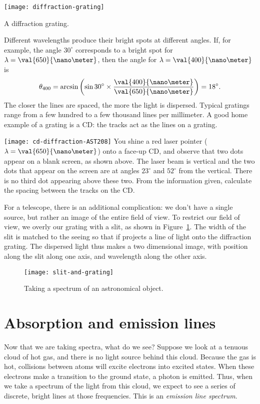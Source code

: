\begin{marginfigure}
\texttt{[image: diffraction-grating]}
\caption{A diffraction grating.
\label{f.diffraction-grating}}
\end{marginfigure}

Different wavelengths produce their bright spots at different angles.  If, for example, the angle $30^{\circ}$ corresponds to a bright spot for $\lambda=\val{650}{\nano\meter}$, then the angle for $\lambda=\val{400}{\nano\meter}$ is
\[
\theta_{400} = \arcsin\left(\sin 30^{\circ}\times\frac{\val{400}{\nano\meter}}{\val{650}{\nano\meter}}\right) = 18^{\circ}.
\]
The closer the lines are spaced, the more the light is dispersed. Typical gratings range from a few hundred to a few thousand lines per millimeter. A good home example of a grating is a CD: the tracks act as the lines on a grating.

\begin{exercisebox}
\texttt{[image: cd-diffraction-AST208]}
You shine a red laser pointer ($\lambda=\val{650}{\nano\meter}$) onto a face-up CD, and observe that two dots appear on a blank screen, as shown above. The laser beam is vertical and the two dots that appear on the screen are at angles $23^{\circ}$ and $52^{\circ}$ from the vertical. There is no third dot appearing above these two. From the information given, calculate the spacing between the tracks on the CD.
\end{exercisebox}

For a telescope, there is an additional complication: we don't have a single source, but rather an image of the entire field of view. To restrict our field of view, we overly our grating with a slit, as shown in Figure~\ref{f.slit-and-grating}. The width of the slit is matched to the seeing so that if projects a line of light onto the diffraction grating. The dispersed light thus makes a two dimensional image, with position along the slit along one axis, and wavelength along the other axis.

\begin{figure}[htbp]
\texttt{[image: slit-and-grating]}
\caption{Taking a spectrum of an astronomical object.
\label{f.slit-and-grating}}
\end{figure}

\section{Absorption and emission lines}
Now that we are taking spectra, what do we see?  Suppose we look at a tenuous cloud of hot gas, and there is no light source behind this cloud. Because the gas is hot, collisions between atoms will excite electrons into excited states. When these electrons make a transition to the ground state, a photon is emitted. Thus, when we take a spectrum of the light from this cloud, we expect to see a series of discrete, bright lines at those frequencies. This is an \emph{emission line spectrum}. 

